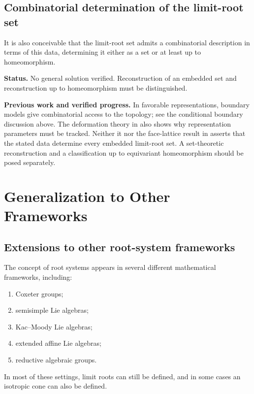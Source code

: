 \documentclass[11pt,reqno]{amsart}
\theoremstyle{plain}
\theoremstyle{definition}
\theoremstyle{remark}
\numberwithin{equation}{section}
\begin{document}
\subsection{Combinatorial determination of the limit-root set}

It is also conceivable that the limit-root set admits
a combinatorial description in terms of this data,
determining it either as a set or at least up to
homeomorphism.


\par\medskip
\noindent\textbf{Status.} No general solution verified. Reconstruction of an embedded set and reconstruction up to homeomorphism must be distinguished.

\par\medskip
\noindent\textbf{Previous work and verified progress.}
In favorable representations, boundary models give combinatorial
access to the topology; see the conditional boundary discussion above.
The deformation theory in \cite[Section~8]{DGKLM2025} also shows why
representation parameters must be tracked. Neither it nor the face-lattice
result in \cite{Dyer2019} asserts that the stated data determine every
embedded limit-root set. A set-theoretic reconstruction and a classification
up to equivariant homeomorphism should be posed separately.

\section{Generalization to Other Frameworks}

\subsection{Extensions to other root-system frameworks}

The concept of root systems appears in several
different mathematical frameworks, including:
\begin{enumerate}
    \item Coxeter groups;
    \item semisimple Lie algebras;
    \item Kac--Moody Lie algebras;
    \item extended affine Lie algebras;
    \item reductive algebraic groups.
\end{enumerate}

In most of these settings, limit roots can still be
defined, and in some cases an isotropic cone can
also be defined.
\end{document}
